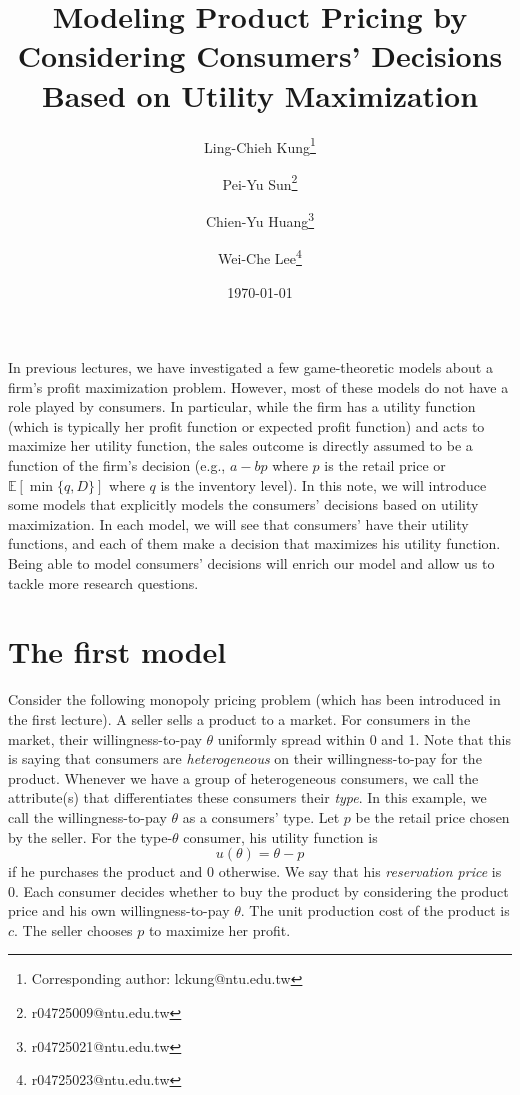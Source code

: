 \documentclass[12pt,a4paper]{article}
\title{Modeling Product Pricing by Considering 
Consumers' Decisions Based on Utility Maximization}
\author[1]{Ling-Chieh Kung\thanks{Corresponding author: lckung@ntu.edu.tw}}
\author[1]{Pei-Yu Sun\thanks{r04725009@ntu.edu.tw}}
\author[1]{Chien-Yu Huang\thanks{r04725021@ntu.edu.tw}}
\author[1]{Wei-Che Lee\thanks{r04725023@ntu.edu.tw}}
\date{\today}
\affil[1]{Department of Information Management, National Taiwan University.}
\date{}
\begin{document}
\maketitle












In previous lectures, we have investigated a few game-theoretic models
about a firm's profit maximization problem. 
However, most of these models do not have a role played by consumers. 
In particular, while the firm has a utility function (which is typically 
her profit function or expected profit function) and acts to maximize her 
utility function, the sales outcome is directly assumed to be a function of the 
firm's decision (e.g., $a - bp$ where $p$ is the retail price or 
$\mathbb{E}[\min\{q, D\}]$ where $q$ is the inventory level). 
In this note, we will introduce some models that explicitly models the 
consumers' decisions based on utility maximization. 
In each model, we will see that consumers' have their utility functions, 
and each of them make a decision that maximizes his utility function. 
Being able to model consumers' decisions will enrich our model and 
allow us to tackle more research questions. 







\section{The first model}

Consider the following monopoly pricing problem (which has been introduced 
in the first lecture). A seller sells a product to a market. For consumers 
in the market, their willingness-to-pay $\theta$ uniformly spread within 0 and 1. 
Note that this is saying that consumers are \textit{heterogeneous} on 
their willingness-to-pay for the product. Whenever we have a group of 
heterogeneous consumers, we call the attribute(s) that differentiates 
these consumers their \textit{type}. In this example, 
we call the willingness-to-pay $\theta$ as a consumers' type. 
Let $p$ be the retail price chosen by the seller. 
For the type-$\theta$ consumer, his utility function is 
\[
	u(\theta) = \theta - p 
\]
if he purchases the product and 0 otherwise. 
We say that his \textit{reservation price} is 0. 
Each consumer decides whether to buy the product by considering the product 
price and his own willingness-to-pay $\theta$. 
The unit production cost of the product is $c$. 
The seller chooses $p$ to maximize her profit. 
\end{document}
